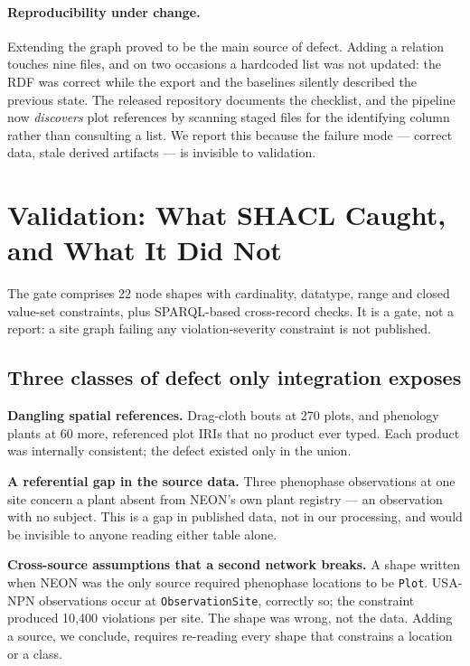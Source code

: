 \paragraph{Reproducibility under change.} Extending the graph proved to be the
main source of defect. Adding a relation touches nine files, and on two
occasions a hardcoded list was not updated: the RDF was correct while the
export and the baselines silently described the previous state. The released
repository documents the checklist, and the pipeline now \emph{discovers}
plot references by scanning staged files for the identifying column rather than
consulting a list. We report this because the failure mode --- correct data,
stale derived artifacts --- is invisible to validation.

\section{Validation: What SHACL Caught, and What It Did Not}
\label{sec:validation}

The gate comprises 22 node shapes with cardinality, datatype, range and closed
value-set constraints, plus SPARQL-based cross-record checks. It is a gate, not
a report: a site graph failing any violation-severity constraint is not
published.

\subsection{Three classes of defect only integration exposes}

\textbf{Dangling spatial references.} Drag-cloth bouts at 270 plots, and
phenology plants at 60 more, referenced plot IRIs that no product ever typed.
Each product was internally consistent; the defect existed only in the union.

\textbf{A referential gap in the source data.} Three phenophase observations at
one site concern a plant absent from NEON's own plant registry --- an
observation with no subject. This is a gap in published data, not in our
processing, and would be invisible to anyone reading either table alone.

\textbf{Cross-source assumptions that a second network breaks.} A shape written
when NEON was the only source required phenophase locations to be
\texttt{Plot}. USA-NPN observations occur at \texttt{ObservationSite}, correctly
so; the constraint produced 10{,}400 violations per site. The shape was wrong,
not the data. Adding a source, we conclude, requires re-reading every shape
that constrains a location or a class.

